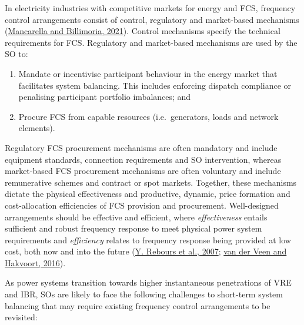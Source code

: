 \documentclass[12pt,a4paper,]{report}
\begin{document}
In electricity industries with competitive markets for energy and FCS,
frequency control arrangements consist of control, regulatory and
market-based mechanisms
(\protect\hyperlink{ref-mancarellaFragileGridPhysics2021}{Mancarella and
Billimoria, 2021}). Control mechanisms specify the technical
requirements for FCS. Regulatory and market-based mechanisms are used by
the SO to:

\begin{enumerate}
\def\labelenumi{\arabic{enumi}.}
\item
  Mandate or incentivise participant behaviour in the energy market that
  facilitates system balancing. This includes enforcing dispatch
  compliance or penalising participant portfolio imbalances; and
\item
  Procure FCS from capable resources (i.e.~generators, loads and network
  elements).
\end{enumerate}

Regulatory FCS procurement mechanisms are often mandatory and include
equipment standards, connection requirements and SO intervention,
whereas market-based FCS procurement mechanisms are often voluntary and
include remunerative schemes and contract or spot markets. Together,
these mechanisms dictate the physical effectiveness and productive,
dynamic, price formation and cost-allocation efficiencies of FCS
provision and procurement. Well-designed arrangements should be
effective and efficient, where \emph{effectiveness} entails sufficient
and robust frequency response to meet physical power system requirements
and \emph{efficiency} relates to frequency response being provided at
low cost, both now and into the future
(\protect\hyperlink{ref-reboursFundamentalDesignIssues2007}{Y. Rebours
et al., 2007};
\protect\hyperlink{ref-vanderveenElectricityBalancingMarket2016}{van der
Veen and Hakvoort, 2016}).

As power systems transition towards higher instantaneous penetrations of
VRE and IBR, SOs are likely to face the following challenges to
short-term system balancing that may require existing frequency control
arrangements to be revisited:
\end{document}
